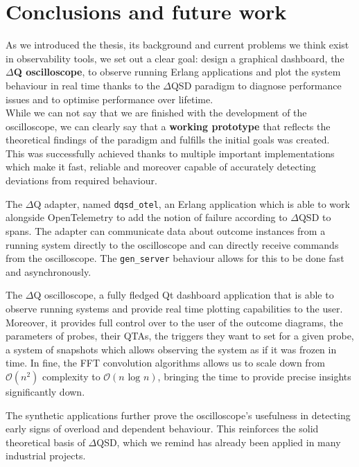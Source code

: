\chapter{Conclusions and future work}

    As we introduced the thesis, its background and current problems we think exist in observability tools, we set out a clear goal: design a graphical dashboard, the \textbf{$\Delta$Q oscilloscope}, to observe running Erlang applications and plot the system behaviour in real time thanks to the $\Delta$QSD paradigm to diagnose performance issues and to optimise performance over lifetime. \\
    While we can not say that we are finished with the development of the oscilloscope, we can clearly say that a \textbf{working prototype} that reflects the theoretical findings of the paradigm and fulfills the initial goals was created. \\
    This was successfully achieved thanks to multiple important implementations which make it fast, reliable and moreover capable of accurately detecting deviations from required behaviour.
    
    The $\Delta$Q adapter, named \texttt{dqsd\_otel}, an Erlang application which is able to work alongside OpenTelemetry to add the notion of failure according to $\Delta$QSD to spans. The adapter can communicate data about outcome instances from a running system directly to the oscilloscope and can directly receive commands from the oscilloscope. The \texttt{gen\_server} behaviour allows for this to be done fast and asynchronously.


    The $\Delta$Q oscilloscope, a fully fledged Qt dashboard application that is able to observe running systems and provide real time plotting capabilities to the user. Moreover, it provides full control over to the user of the outcome diagrams, the parameters of probes, their QTAs, the triggers they want to set for a given probe, a system of snapshots which allows observing the system as if it was frozen in time. In fine, the FFT convolution algorithms allows us to scale down from $\mathcal{O}(n^2)$ complexity to $\mathcal{O}(n\text{ log }n)$, bringing the time to provide precise insights significantly down.

    The synthetic applications further prove the oscilloscope's usefulness in detecting early signs of overload and dependent behaviour. This reinforces the solid theoretical basis of $\Delta$QSD, which we remind has already been applied in many industrial projects.

